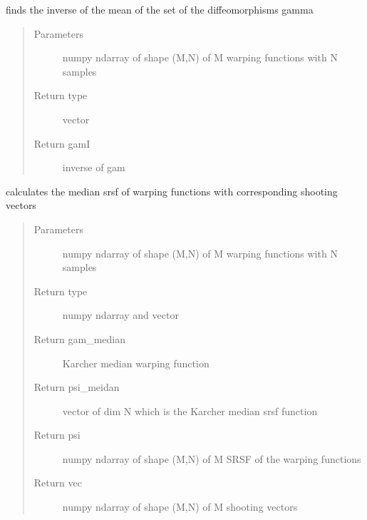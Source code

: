 \documentclass[letterpaper,10pt,english]{sphinxmanual}
\begin{document}

\begin{fulllineitems}
\label{\detokenize{utility_functions:utility_functions.SqrtMeanInverse}}
finds the inverse of the mean of the set of the diffeomorphisms gamma
\begin{quote}\begin{description}
\item[{Parameters}] \leavevmode
{} \textendash{} numpy ndarray of shape (M,N) of M warping functions
with N samples

\item[{Return type}] \leavevmode
vector

\item[{Return gamI}] \leavevmode
inverse of gam

\end{description}\end{quote}

\end{fulllineitems}


\begin{fulllineitems}
\label{\detokenize{utility_functions:utility_functions.SqrtMedian}}
calculates the median srsf of warping functions with corresponding shooting vectors
\begin{quote}\begin{description}
\item[{Parameters}] \leavevmode
{} \textendash{} numpy ndarray of shape (M,N) of M warping functions
with N samples

\item[{Return type}]  numpy ndarray and vector

\item[{Return gam\_median}] \leavevmode
Karcher median warping function

\item[{Return psi\_meidan}] \leavevmode
vector of dim N which is the Karcher median srsf function

\item[{Return psi}] \leavevmode
numpy ndarray of shape (M,N) of M SRSF of the warping functions

\item[{Return vec}] \leavevmode
numpy ndarray of shape (M,N) of M shooting vectors

\end{description}\end{quote}

\end{fulllineitems}
\end{document}
